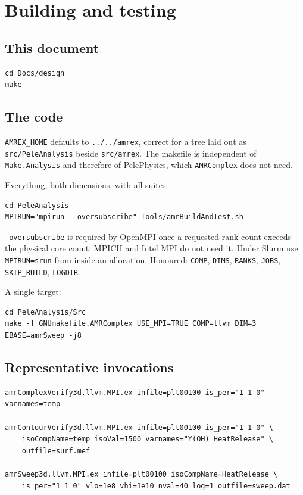 \chapter{Building and testing}
\label{app:build}

\section{This document}

\begin{lstlisting}[style=sh]
cd Docs/design
make
\end{lstlisting}

\section{The code}

\texttt{AMREX\_HOME} defaults to \texttt{../../amrex}, correct for a tree laid
out as \texttt{src/PeleAnalysis} beside \texttt{src/amrex}. The makefile is
independent of \texttt{Make.Analysis} and therefore of PelePhysics, which
\texttt{AMRComplex} does not need.

Everything, both dimensions, with all suites:

\begin{lstlisting}[style=sh]
cd PeleAnalysis
MPIRUN="mpirun --oversubscribe" Tools/amrBuildAndTest.sh
\end{lstlisting}

\texttt{--oversubscribe} is required by OpenMPI once a requested rank count
exceeds the physical core count; MPICH and Intel MPI do not need it. Under Slurm
use \texttt{MPIRUN=srun} from inside an allocation. Honoured:
\texttt{COMP}, \texttt{DIMS}, \texttt{RANKS}, \texttt{JOBS},
\texttt{SKIP\_BUILD}, \texttt{LOGDIR}.

A single target:

\begin{lstlisting}[style=sh]
cd PeleAnalysis/Src
make -f GNUmakefile.AMRComplex USE_MPI=TRUE COMP=llvm DIM=3 EBASE=amrSweep -j8
\end{lstlisting}

\section{Representative invocations}

\begin{lstlisting}[style=sh]
amrComplexVerify3d.llvm.MPI.ex infile=plt00100 is_per="1 1 0" varnames=temp

amrContourVerify3d.llvm.MPI.ex infile=plt00100 is_per="1 1 0" \
    isoCompName=temp isoVal=1500 varnames="Y(OH) HeatRelease" \
    outfile=surf.mef

amrSweep3d.llvm.MPI.ex infile=plt00100 isoCompName=HeatRelease \
    is_per="1 1 0" vlo=1e8 vhi=1e10 nval=40 log=1 outfile=sweep.dat
\end{lstlisting}

